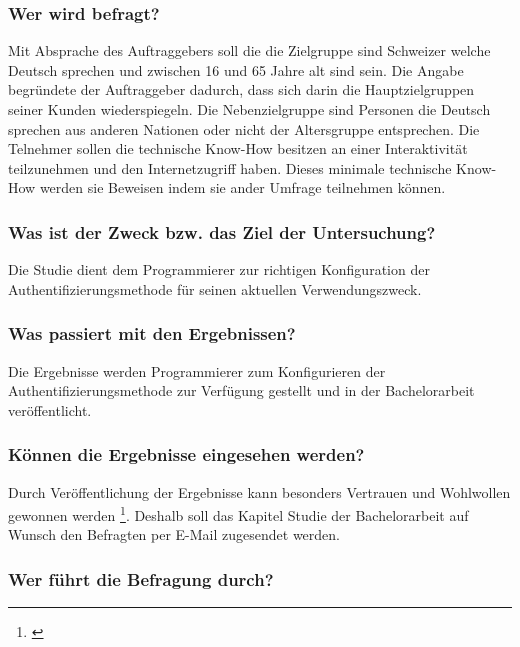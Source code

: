 \subsubsection{Wer wird befragt?}\label{wer-wird-befragt}

Mit Absprache des Auftraggebers soll die die Zielgruppe sind Schweizer
welche Deutsch sprechen und zwischen 16 und 65 Jahre alt sind sein. Die
Angabe begründete der Auftraggeber dadurch, dass sich darin die
Hauptzielgruppen seiner Kunden wiederspiegeln. Die Nebenzielgruppe sind
Personen die Deutsch sprechen aus anderen Nationen oder nicht der
Altersgruppe entsprechen. Die Telnehmer sollen die technische Know-How
besitzen an einer Interaktivität teilzunehmen und den Internetzugriff
haben. Dieses minimale technische Know-How werden sie Beweisen indem sie
ander Umfrage teilnehmen können.

\subsubsection{Was ist der Zweck bzw. das Ziel der
Untersuchung?}\label{was-ist-der-zweck-bzw.-das-ziel-der-untersuchung}

Die Studie dient dem Programmierer zur richtigen Konfiguration der
Authentifizierungsmethode für seinen aktuellen Verwendungszweck.

\subsubsection{Was passiert mit den
Ergebnissen?}\label{was-passiert-mit-den-ergebnissen}

Die Ergebnisse werden Programmierer zum Konfigurieren der
Authentifizierungsmethode zur Verfügung gestellt und in der
Bachelorarbeit veröffentlicht.

\subsubsection{Können die Ergebnisse eingesehen
werden?}\label{kuxf6nnen-die-ergebnisse-eingesehen-werden}

Durch Veröffentlichung der Ergebnisse kann besonders Vertrauen und
Wohlwollen gewonnen werden \footnote{\autocite{fragebogen}}. Deshalb
soll das Kapitel Studie der Bachelorarbeit auf Wunsch den Befragten per
E-Mail zugesendet werden.

\subsubsection{Wer führt die Befragung
durch?}\label{wer-fuxfchrt-die-befragung-durch}

